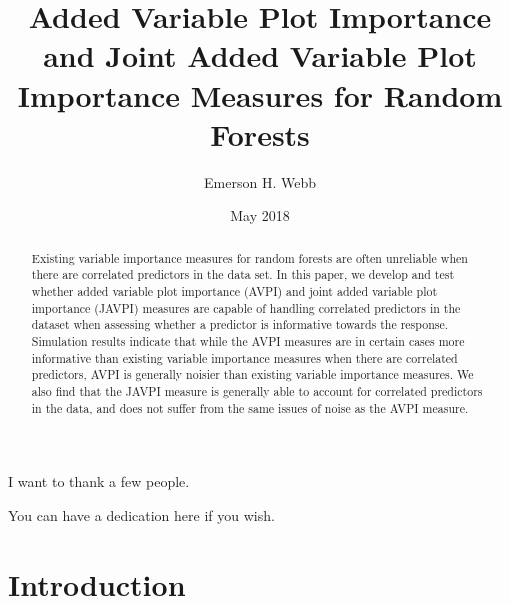 \documentclass[12pt,twoside]{reedthesis}
\title{Added Variable Plot Importance and Joint Added Variable Plot Importance
Measures for Random Forests}
\author{Emerson H. Webb}
\date{May 2018}
\theoremstyle{definition}
\theoremstyle{definition}
\theoremstyle{definition}
\theoremstyle{remark}
\begin{document}
  \maketitle

\frontmatter %
\pagestyle{empty} %
  \begin{acknowledgements}
    I want to thank a few people.
  \end{acknowledgements}

  \hypersetup{linkcolor=black}
  \setcounter{tocdepth}{2}
  \tableofcontents

  \listoftables

  \listoffigures
  \begin{abstract}
    Existing variable importance measures for random forests are often
    unreliable when there are correlated predictors in the data set. In this
    paper, we develop and test whether added variable plot importance (AVPI)
    and joint added variable plot importance (JAVPI) measures are capable of
    handling correlated predictors in the dataset when assessing whether a
    predictor is informative towards the response. Simulation results
    indicate that while the AVPI measures are in certain cases more
    informative than existing variable importance measures when there are
    correlated predictors, AVPI is generally noisier than existing variable
    importance measures. We also find that the JAVPI measure is generally
    able to account for correlated predictors in the data, and does not
    suffer from the same issues of noise as the AVPI measure.
  \end{abstract}
  \begin{dedication}
    You can have a dedication here if you wish.
  \end{dedication}
\mainmatter %
\pagestyle{fancyplain} %

\chapter*{Introduction}\label{introduction}
\end{document}
